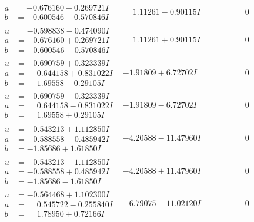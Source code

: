 \documentclass[1p]{elsarticle_modified}
\theoremstyle{definition}
\begin{document}
$$\begin{array}{c|c|c}
\begin{aligned}
a &= -0.676160 - 0.269721 I \\
b &= -0.600546 + 0.570846 I\end{aligned}
 & \phantom{-}1.11261 - 0.90115 I & \phantom{-0.000000 } 0 \\ \hline\begin{aligned}
u &= -0.598838 - 0.474090 I \\
a &= -0.676160 + 0.269721 I \\
b &= -0.600546 - 0.570846 I\end{aligned}
 & \phantom{-}1.11261 + 0.90115 I & \phantom{-0.000000 } 0 \\ \hline\begin{aligned}
u &= -0.690759 + 0.323339 I \\
a &= \phantom{-}0.644158 + 0.831022 I \\
b &= \phantom{-}1.69558 - 0.29105 I\end{aligned}
 & -1.91809 + 6.72702 I & \phantom{-0.000000 } 0 \\ \hline\begin{aligned}
u &= -0.690759 - 0.323339 I \\
a &= \phantom{-}0.644158 - 0.831022 I \\
b &= \phantom{-}1.69558 + 0.29105 I\end{aligned}
 & -1.91809 - 6.72702 I & \phantom{-0.000000 } 0 \\ \hline\begin{aligned}
u &= -0.543213 + 1.112850 I \\
a &= -0.588558 - 0.485942 I \\
b &= -1.85686 + 1.61850 I\end{aligned}
 & -4.20588 - 11.47960 I & \phantom{-0.000000 } 0 \\ \hline\begin{aligned}
u &= -0.543213 - 1.112850 I \\
a &= -0.588558 + 0.485942 I \\
b &= -1.85686 - 1.61850 I\end{aligned}
 & -4.20588 + 11.47960 I & \phantom{-0.000000 } 0 \\ \hline\begin{aligned}
u &= -0.564468 + 1.102300 I \\
a &= \phantom{-}0.545722 - 0.255840 I \\
b &= \phantom{-}1.78950 + 0.72166 I\end{aligned}
 & -6.79075 - 11.02120 I & \phantom{-0.000000 } 0 \\ \hline\begin{aligned}

\end{aligned}
\end{array}$$
\end{document}
